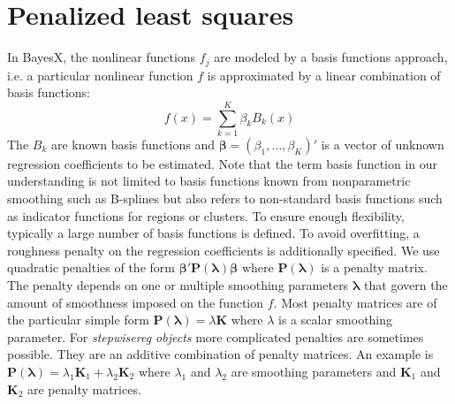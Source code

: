 \documentclass[11pt,a4paper,twoside]{bayesxarticle}
\def \Kvec {\vec{K}}
\def \Pvec {\vec{P}}
\def \lambdavec {\boldsymbol{\lambda}}
\def \betavec {\boldsymbol{\beta}}
\def \Kvec {\mathbf{K}}
\def \Pvec {\mathbf{P}}
\begin{document}
%
\section{Penalized least squares}
\label{penalizedleastsquares}

In BayesX, the nonlinear functions $f_j$ are modeled by a basis
functions approach, i.e. a particular nonlinear function $f$ is
approximated by a linear combination of basis functions:
$$
f(x) = \sum_{k=1}^{K} \beta_k B_k(x)
$$
The $B_k$ are known basis functions and $\betavec =
(\beta_1,\dots,\beta_K)'$ is a vector of unknown regression
coefficients to be estimated. Note that the term basis function in
our understanding is not limited to basis functions known from
nonparametric smoothing such as B-splines but also refers to
non-standard basis functions such as indicator functions for regions
or clusters. To ensure enough flexibility, typically a large number
of basis functions is defined. To avoid overfitting, a roughness
penalty on the regression coefficients is additionally specified. We
use quadratic penalties of the form $\betavec' \Pvec(\lambdavec)
\betavec$ where $\Pvec(\lambdavec)$ is a penalty matrix. The penalty
depends on one or multiple smoothing parameters $\lambdavec$ that
govern the amount of smoothness imposed on the function $f$. Most
penalty matrices are of the particular simple form
$\Pvec(\lambdavec) = \lambda \Kvec$ where $\lambda$ is a scalar
smoothing parameter. For {\em stepwisereg objects} more complicated
penalties are sometimes possible. They are an additive combination
of penalty matrices. An example is $\Pvec(\lambdavec) = \lambda_1
\Kvec_1+\lambda_2 \Kvec_2$ where $\lambda_1$ and $\lambda_2$ are
smoothing parameters and $\Kvec_1$ and $\Kvec_2$ are penalty
matrices.
\end{document}
